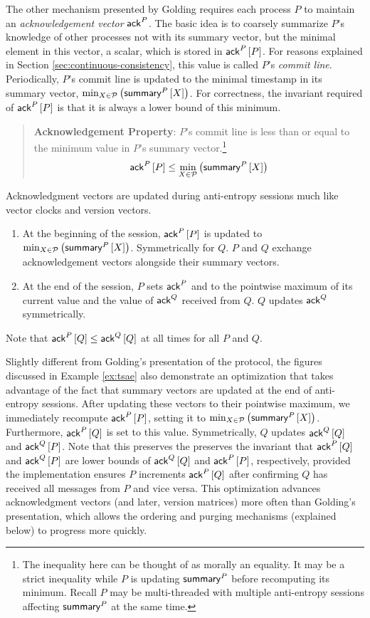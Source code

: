 \documentclass[]             %
{NASA}                       %
\theoremstyle{definition}
\begin{document}
The other mechanism presented by Golding requires each process $P$
to maintain an \emph{acknowledgement vector} $\mathsf{ack}^{P}$. The basic idea
is to coarsely summarize $P$'s knowledge of other processes not with
its summary vector, but the minimal element in this vector, a scalar,
which is stored in $\mathsf{ack}^{P}\left[P\right]$. For reasons explained in
Section \ref{sec:continuous-consistency}, this value is called $P$'s \emph{commit
  line}. Periodically, $P$'s commit line is updated to the minimal
timestamp in its summary vector,
$\min_{X \in \mathcal{P}} \left(\mathsf{summary}^{P}\left[X\right]\right)$.  For correctness,
the invariant required of $\mathsf{ack}^{P}\left[P\right]$ is that it is always a lower
bound of this minimum.
\begin{quote}
  \textbf{Acknowledgement Property}: $P$'s commit line is less than or
  equal to the minimum value in $P$'s summary vector.\footnote{The
    inequality here can be thought of as morally an equality. It may
    be a strict inequality while $P$ is updating $\mathsf{summary}^{P}$
    before recomputing its minimum. Recall $P$ may be multi-threaded
    with multiple anti-entropy sessions affecting $\mathsf{summary}^{P}$ at
    the same time.}
  \begin{equation*}
    \mathsf{ack}^{P}\left[P\right] \leq \min_{X \in \mathcal{P}} \left(\mathsf{summary}^{P}\left[X\right]\right)
\end{equation*}
\end{quote}

Acknowledgment vectors are updated during anti-entropy sessions much
like vector clocks and version vectors.
\begin{enumerate}
\item At the beginning of the session, $\mathsf{ack}^{P}\left[P\right]$ is updated to
  $\min_{X \in \mathcal{P}} \left(\mathsf{summary}^{P}\left[X\right]\right)$. Symmetrically
  for $Q$. $P$ and $Q$ exchange acknowledgement vectors alongside
  their summary vectors.
\item At the end of the session, $P$ sets $\mathsf{ack}^{P}$ and to the
  pointwise maximum of its current value and the value of $\mathsf{ack}^{Q}$
  received from $Q$. $Q$ updates $\mathsf{ack}^{Q}$ symmetrically.
\end{enumerate}
Note that $\mathsf{ack}^{P}\left[Q\right] \leq \mathsf{ack}^{Q}\left[Q\right]$ at all times for all $P$ and
$Q$.

Slightly different from Golding's presentation of the protocol, the
figures discussed in Example \ref{ex:tsae} also demonstrate an
optimization that takes advantage of the fact that summary vectors are
updated at the end of anti-entropy sessions. After updating these
vectors to their pointwise maximum, we immediately recompute
$\mathsf{ack}^{P}\left[P\right]$, setting it to
$\min_{X \in \mathcal{P}} \left(\mathsf{summary}^{P}\left[X\right]\right)$. Furthermore,
$\mathsf{ack}^{P}\left[Q\right]$ is set to this value. Symmetrically, $Q$ updates
$\mathsf{ack}^{Q}\left[Q\right]$ and $\mathsf{ack}^{Q}\left[P\right]$. Note that this preserves the preserves
the invariant that $\mathsf{ack}^{P}\left[Q\right]$ and $\mathsf{ack}^{Q}\left[P\right]$ are lower bounds of
$\mathsf{ack}^{Q}\left[Q\right]$ and $\mathsf{ack}^{P}\left[P\right]$, respectively, provided the
implementation ensures $P$ increments $\mathsf{ack}^{P}\left[Q\right]$ after confirming
$Q$ has received all messages from $P$ and vice versa. This
optimization advances acknowledgment vectors (and later, version
matrices) more often than Golding's presentation, which allows the
ordering and purging mechanisms (explained below) to progress more
quickly.
\end{document}
